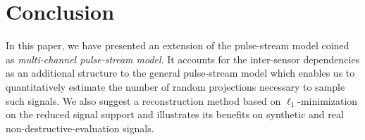 \documentclass{article}
\theoremstyle{definition}
\begin{document}
\section{Conclusion}
\label{sec_concl}
In this paper, we have presented an extension of the pulse-stream model coined as \textit{multi-channel pulse-stream model}. It accounts for the inter-sensor dependencies as an additional structure to the general pulse-stream model which enables us to quantitatively estimate the number of random projections necessary to sample such signals. We also suggest a reconstruction method based on $\ell_1$-minimization on the reduced signal support and illustrates its benefits on synthetic and real non-destructive-evaluation signals.






%





\end{document}
